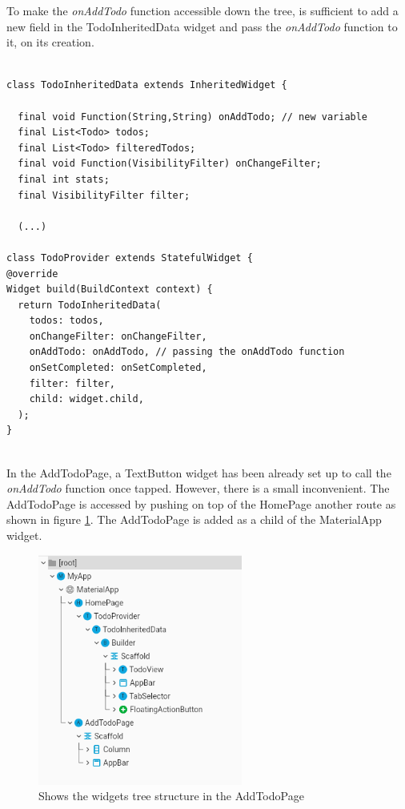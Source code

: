 To make the \textit{onAddTodo} function accessible down the tree, is sufficient to add a new field in the TodoInheritedData widget and pass the \textit{onAddTodo} function to it, on its creation.
\mbox{}\\
\begin{code}

\mbox{}

\label{code:2.33}
\begin{verbatim}

class TodoInheritedData extends InheritedWidget {
  
  final void Function(String,String) onAddTodo; // new variable
  final List<Todo> todos;
  final List<Todo> filteredTodos;
  final void Function(VisibilityFilter) onChangeFilter;
  final int stats;
  final VisibilityFilter filter;

  (...)

class TodoProvider extends StatefulWidget {
@override
Widget build(BuildContext context) {
  return TodoInheritedData(
    todos: todos,
    onChangeFilter: onChangeFilter,
    onAddTodo: onAddTodo, // passing the onAddTodo function
    onSetCompleted: onSetCompleted,
    filter: filter,
    child: widget.child,
  );
}
\end{verbatim}
\end{code}
\mbox{}\\
In the AddTodoPage, a TextButton widget has been already set up to call the \textit{onAddTodo }function once tapped. However, there is a small inconvenient. The AddTodoPage is accessed by pushing on top of the HomePage another route as shown in figure \ref{fig:add_todo_page_tree_structure}. The AddTodoPage is added as a child of the MaterialApp widget.

\begin{figure}[H]
    \centering
    \includegraphics[width=0.6\textwidth]{Images/tree_structure_on_AddTodoPage.png}
    \caption{Shows the widgets tree structure in the AddTodoPage}
    \label{fig:add_todo_page_tree_structure}
\end{figure}


